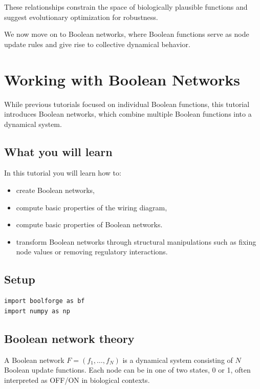 \documentclass[
]{article}
\providecommand{\tightlist}{%
  \setlength{\itemsep}{0pt}\setlength{\parskip}{0pt}}
\begin{document}
These relationships constrain the space of biologically plausible
functions and suggest evolutionary optimization for robustness.

We now move on to Boolean networks, where Boolean functions serve as
node update rules and give rise to collective dynamical behavior.

\section{Working with Boolean
Networks}\label{working-with-boolean-networks}

While previous tutorials focused on individual Boolean functions, this
tutorial introduces Boolean networks, which combine multiple Boolean
functions into a dynamical system.

\subsection{What you will learn}\label{what-you-will-learn-5}

In this tutorial you will learn how to:

\begin{itemize}
\tightlist
\item
  create Boolean networks,
\item
  compute basic properties of the wiring diagram,
\item
  compute basic properties of Boolean networks.
\item
  transform Boolean networks through structural manipulations such as
  fixing node values or removing regulatory interactions.
\end{itemize}

\subsection{Setup}\label{setup-5}

\begin{lstlisting}
import boolforge as bf
import numpy as np
\end{lstlisting}

\subsection{Boolean network theory}\label{boolean-network-theory}

A Boolean network \(F = (f_1, \ldots, f_N)\) is a dynamical system
consisting of \(N\) Boolean update functions. Each node can be in one of
two states, 0 or 1, often interpreted as OFF/ON in biological contexts.
\end{document}
